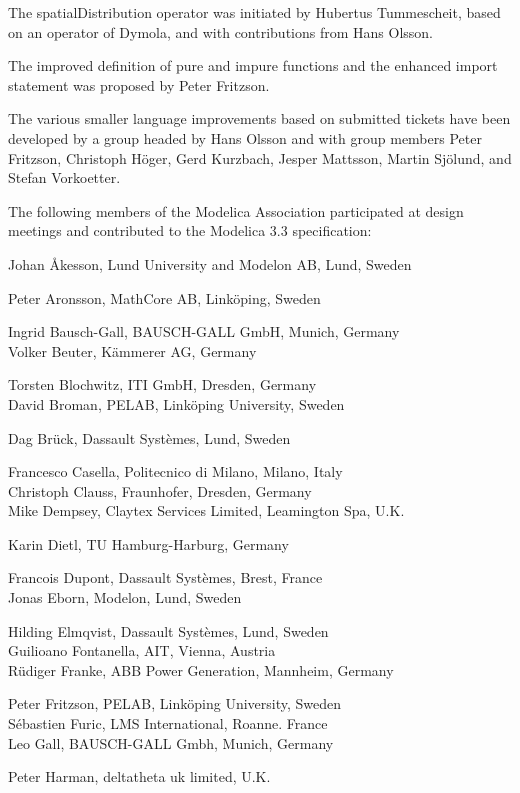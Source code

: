 \documentclass[10pt,a4paper]{report}
\begin{document}
The spatialDistribution operator was initiated by Hubertus Tummescheit,
based on an operator of Dymola, and with contributions from Hans Olsson.

The improved definition of pure and impure functions and the enhanced
import statement was proposed by Peter Fritzson.

The various smaller language improvements based on submitted tickets
have been developed by a group headed by Hans Olsson and with group
members Peter Fritzson, Christoph Höger, Gerd Kurzbach, Jesper Mattsson,
Martin Sjölund, and Stefan Vorkoetter.

The following members of the Modelica Association participated at design
meetings and contributed to the Modelica 3.3 specification:

Johan Åkesson, Lund University and Modelon AB, Lund, Sweden

Peter Aronsson, MathCore AB, Linköping, Sweden

Ingrid Bausch-Gall, BAUSCH-GALL GmbH, Munich, Germany\\
Volker Beuter, Kämmerer AG, Germany

Torsten Blochwitz, ITI GmbH, Dresden, Germany\\
David Broman, PELAB, Linköping University, Sweden

Dag Brück, Dassault Systèmes, Lund, Sweden

Francesco Casella, Politecnico di Milano, Milano, Italy\\
Christoph Clauss, Fraunhofer, Dresden, Germany\\
Mike Dempsey, Claytex Services Limited, Leamington Spa, U.K.

Karin Dietl, TU Hamburg-Harburg, Germany

Francois Dupont, Dassault Systèmes, Brest, France\\
Jonas Eborn, Modelon, Lund, Sweden

Hilding Elmqvist, Dassault Systèmes, Lund, Sweden\\
Guilioano Fontanella, AIT, Vienna, Austria\\
Rüdiger Franke, ABB Power Generation, Mannheim, Germany

Peter Fritzson, PELAB, Linköping University, Sweden\\
Sébastien Furic, LMS International, Roanne. France\\
Leo Gall, BAUSCH-GALL Gmbh, Munich, Germany

Peter Harman, deltatheta uk limited, U.K.
\end{document}
